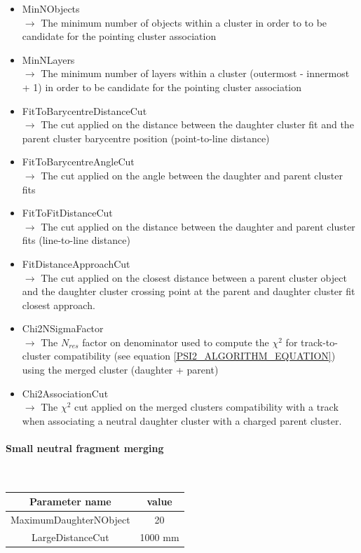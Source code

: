 \documentclass[cits]{JINST}
\begin{document}
\begin{itemize}
  \item MinNObjects \\
  $\rightarrow$ The minimum number of objects within a cluster in order to to be candidate for the pointing cluster association
  \item MinNLayers \\
  $\rightarrow$ The minimum number of layers within a cluster (outermost - innermost + 1) in order to be candidate for the pointing cluster association
  \item FitToBarycentreDistanceCut \\
  $\rightarrow$ The cut applied on the distance between the daughter cluster fit and the parent cluster barycentre position (point-to-line distance)
  \item FitToBarycentreAngleCut \\
  $\rightarrow$ The cut applied on the angle between the daughter and parent cluster fits
  \item FitToFitDistanceCut \\
  $\rightarrow$ The cut applied on the distance between the daughter and parent cluster fits (line-to-line distance)
  \item FitDistanceApproachCut \\
  $\rightarrow$ The cut applied on the closest distance between a parent cluster object and the daughter cluster crossing point at the parent and daughter cluster fit closest approach.
  \item Chi2NSigmaFactor \\
  $\rightarrow$ The $N_{res}$ factor on denominator used to compute the $\chi^2$ for track-to-cluster compatibility (see equation \ref{PSI2_ALGORITHM_EQUATION}) using the merged cluster (daughter + parent)
  \item Chi2AssociationCut \\
  $\rightarrow$ The $\chi^2$ cut applied on the merged clusters compatibility with a track when associating a neutral daughter cluster with a charged parent cluster.
\end{itemize}


\paragraph{Small neutral fragment merging} ~

\begin{table}[!ht]
  \begin{center}
    \begin{tabu} to \linewidth { c | c } 
          Parameter name & value \\
          \hline
          MaximumDaughterNObject & 20 \\
          LargeDistanceCut & 1000 mm
    \end{tabu}
  \end{center}
\end{table}
\end{document}
